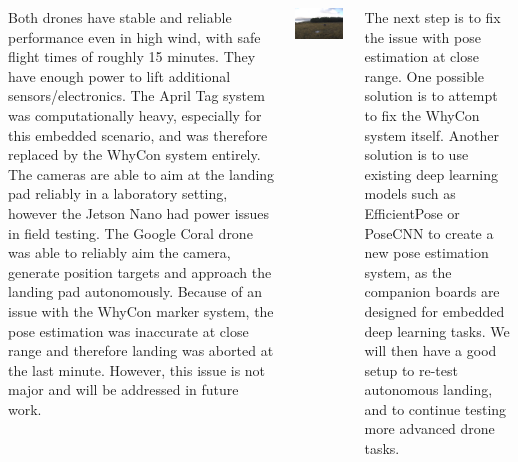 \documentclass[a1paper, landscape, blockverticalspace=1cm]{tikzposter}
\begin{document}
\begin{columns}
    {
        \normalsize
        Both drones have stable and reliable performance even in high wind, with safe flight times of roughly 15 minutes.
        They have enough power to lift additional sensors/electronics.
        The April Tag system was computationally heavy, especially for this embedded scenario, and was therefore replaced by the WhyCon system entirely.
        The cameras are able to aim at the landing pad reliably in a laboratory setting, however the Jetson Nano had power issues in field testing.
        The Google Coral drone was able to reliably aim the camera, generate position targets and approach the landing pad autonomously.
        Because of an issue with the WhyCon marker system, the pose estimation was inaccurate at close range and therefore landing was aborted at the last minute.
        However, this issue is not major and will be addressed in future work.

        \begin{tikzfigure}
            \includegraphics[width=0.9\linewidth]{drone_in_flight.png}
        \end{tikzfigure}
    }
    
    {
        \normalsize
        The next step is to fix the issue with pose estimation at close range.
        One possible solution is to attempt to fix the WhyCon system itself.
        Another solution is to use existing deep learning models such as EfficientPose or PoseCNN to create a new pose estimation system, as the companion boards are designed for embedded deep learning tasks.
        We will then have a good setup to re-test autonomous landing, and to continue testing more advanced drone tasks.
    }
\end{columns}
\end{document}
